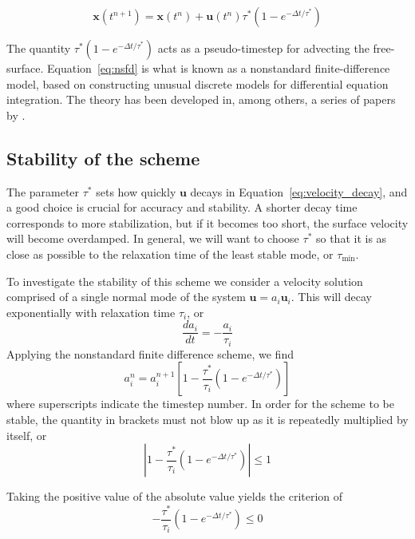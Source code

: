 \documentclass[preprint,12pt,authoryear]{elsarticle}
\newif\ifdetail
\begin{document}
\begin{equation}
\mathbf{x}(t^{n+1}) = \mathbf{x}(t^n) + \mathbf{u}(t^{n}) \tau^* \left(1-e^{-\Delta t/\tau^*} \right)
\label{eq:nsfd}
\end{equation}

The quantity $\tau^*(1-e^{-\Delta t / \tau^*})$ acts as a pseudo-timestep for advecting the free-surface.
Equation~\eqref{eq:nsfd} is what is known as a nonstandard finite-difference model, based on
constructing unusual discrete models for differential equation integration.
The theory has been developed in, among others, a series of papers by
\citet{mickens1994nonstandard, mickens2002nonstandard, mickens2005dynamic}.

\subsection{Stability of the scheme}
The parameter $\tau^*$ sets how quickly $\mathbf{u}$ decays in Equation~\eqref{eq:velocity_decay}, and a good 
choice is crucial for accuracy and stability. A shorter decay time corresponds to more stabilization,
but if it becomes too short, the surface velocity will become overdamped. In general, we will want 
to choose $\tau^*$ so that it is as close as possible to the relaxation time of the least stable mode, or $\tau_{\mathrm{min}}$.

To investigate the stability of this scheme we consider a velocity solution comprised of 
a single normal mode of the system $\mathbf{u} = a_i \mathbf{u}_i$.
This will decay exponentially with relaxation time $\tau_i$, or
\begin{equation}
\frac{d a_i} {dt} = - \frac{ a_i }{\tau_i} 
\end{equation}
Applying the nonstandard finite difference scheme, we find
\begin{equation}
a_i^{n} = a_i^{n+1} \left[ 1 - \frac{\tau^*}{\tau_i} \left(1-e^{-\Delta t/\tau^*} \right) \right]
\label{eq:recursion}
\end{equation}
where superscripts indicate the timestep number.
In order for the scheme to be stable, the quantity in brackets must not blow up as it is repeatedly multiplied by itself, or 
\begin{equation}
\left| 1 - \frac{\tau^*}{\tau_i} \left(1-e^{-\Delta t/\tau^*} \right) \right| \le 1
\end{equation}

\ifdetail
Taking the positive value of the absolute value yields the criterion of 
\begin{equation}
- \frac{\tau^*}{\tau_i} \left(1-e^{-\Delta t/\tau^*} \right) \le 0
\end{equation}
\end{document}
